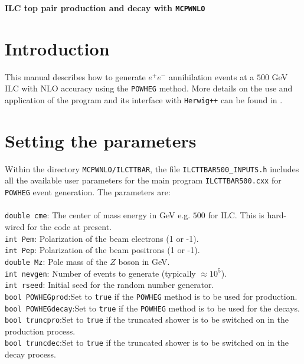 \documentclass[12pt,a4paper,oneside]{article}
\begin{document}
\begin{center}
\Large \textbf {ILC top pair production and decay with {\tt MCPWNLO}} \\
\end{center}
\section{Introduction}
This manual describes how to generate $e^+e^-$ annihilation events at a $500$ GeV ILC with NLO accuracy using the {\tt POWHEG} \cite{Nason:2004rx} method. More details on the use and application of the program and its interface with {\tt Herwig++} \cite{Bahr:2008pv} can be found in \cite{LatundeDada:2008bv}.
\section{Setting the parameters}
Within the directory {\tt MCPWNLO/ILCTTBAR}, the file {\tt ILCTTBAR500\_INPUTS.h} includes all the available user parameters
for the main program {\tt ILCTTBAR500.cxx} for {\tt
  POWHEG} event generation. The parameters are:\\
\\
{\tt double cme}: The center of mass energy in GeV e.g. $500$ for ILC. This is hard-wired
for the code at present.\\
{\tt  int Pem}: Polarization of the beam electrons (1 or -1).\\
{\tt  int Pep}: Polarization of the beam positrons (1 or -1).\\
{\tt double Mz}: Pole mass of the $Z$ boson in GeV.\\
{\tt int nevgen}: Number of events to generate (typically $\approx 10^5$). \\
{\tt int rseed}:  Initial seed for the random number generator. \\ 
{\tt bool POWHEGprod}:Set to {\tt true} if the {\tt POWHEG} method is to be used for production. \\
{\tt bool POWHEGdecay}:Set to {\tt true} if the {\tt POWHEG} method is to be used for the decays. \\
{\tt bool truncpro}:Set to {\tt true} if the truncated shower is to be switched on in the
production process. \\
{\tt bool truncdec}:Set to {\tt true} if the truncated shower is to be switched on in the
decay process.\\
\end{document}
